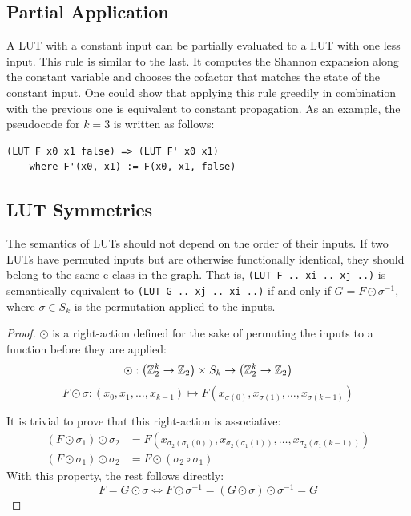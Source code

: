 \subsection{Partial Application}\label{sec:rewrites:application}
A LUT with a constant input can be partially evaluated to a LUT with one less
input. This rule is similar to the last. It computes the Shannon expansion
along the constant variable and chooses the cofactor that matches the state of
the constant input. One could show that applying this rule greedily in
combination with the previous one is equivalent to constant propagation. As an
example, the pseudocode for $k=3$ is written as follows:

\begin{lstlisting}
(LUT F x0 x1 false) => (LUT F' x0 x1)
    where F'(x0, x1) := F(x0, x1, false)
\end{lstlisting}

\subsection{LUT Symmetries}\label{sec:rewrites:symmetry}

The semantics of LUTs should not depend on the order of their inputs. If two
LUTs have permuted inputs but are otherwise functionally identical, they should
belong to the same e-class in the graph. That is, \mbox{\texttt{(LUT F .. xi ..
        xj ..)}} is semantically equivalent to \mbox{\texttt{(LUT G .. xj .. xi ..)}}
if and only if $G = F \odot \sigma^{-1}$, where $\sigma \in S_k$ is the
permutation applied to the inputs.

\begin{proof}
    $\odot$ is a right-action defined for the sake of permuting the inputs to a function before they are applied:
    \begin{equation*} \odot : \big (\mathbb{Z}_{2}^{k} \rightarrow \mathbb{Z}_2 \big ) \times S_k \rightarrow \big (\mathbb{Z}_{2}^{k} \rightarrow \mathbb{Z}_2 \big ) \end{equation*}
    \begin{equation*} F \odot \sigma : (x_0, x_1, \ldots, x_{k-1}) \mapsto F(x_{\sigma(0)}, x_{\sigma(1)}, \ldots, x_{\sigma(k-1)}) \end{equation*}

    It is trivial to prove that this right-action is associative:
    \begin{align*}
        (F \odot \sigma_1) \odot \sigma_2 & = F(x_{\sigma_2(\sigma_1(0))}, x_{\sigma_2(\sigma_1(1))}, \ldots, x_{\sigma_2(\sigma_1(k-1))}) \\
        (F \odot \sigma_1) \odot \sigma_2 & = F \odot (\sigma_2 \circ \sigma_1)
    \end{align*}
    With this property, the rest follows directly:
    \begin{equation}
        F = G \odot
        \sigma \iff F \odot \sigma^{-1} = (G \odot \sigma) \odot \sigma^{-1} = G
    \end{equation}
\end{proof}

